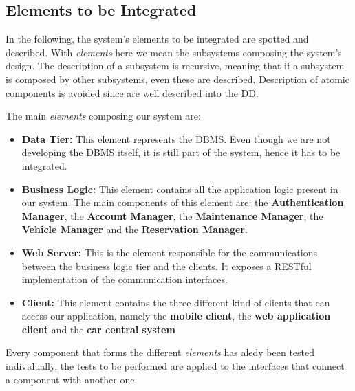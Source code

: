 \subsection{Elements to be Integrated}

In the following, the system's elements to be integrated are spotted and
described. With \textit{elements} here we mean the subsystems composing the
system's design. The description of a subsystem is recursive, meaning that if a
subsystem is composed by other subsystems, even these are described. Description
of atomic components is avoided since are well described into the DD.

The main \textit{elements} composing our system are:
\begin{itemize}
  \item \textbf{Data Tier:} This element represents the DBMS. Even though we are
                            not developing the DBMS itself, it is still part of
                            the system, hence it has to be integrated.
  \item \textbf{Business Logic:} This element contains all the application
                                 logic present in our system. The main
                                 components of this element are: the
                                 \textbf{Authentication Manager}, the
                                 \textbf{Account Manager}, the
                                 \textbf{Maintenance Manager}, the
                                 \textbf{Vehicle Manager} and the
                                 \textbf{Reservation Manager}.
  \item \textbf{Web Server:} This is the element responsible for the
                             communications between the business logic tier and
                             the clients. It exposes a RESTful implementation
                             of the communication interfaces.
  \item \textbf{Client:} This element contains the three different kind of
                         clients that can access our application, namely the
                         \textbf{mobile client}, the
                         \textbf{web application client} and the
                         \textbf{car central system}
\end{itemize}

Every component that forms the different \textit{elements} has aledy been tested
individually, the tests to be performed are applied to the interfaces that
connect a component with another one.
